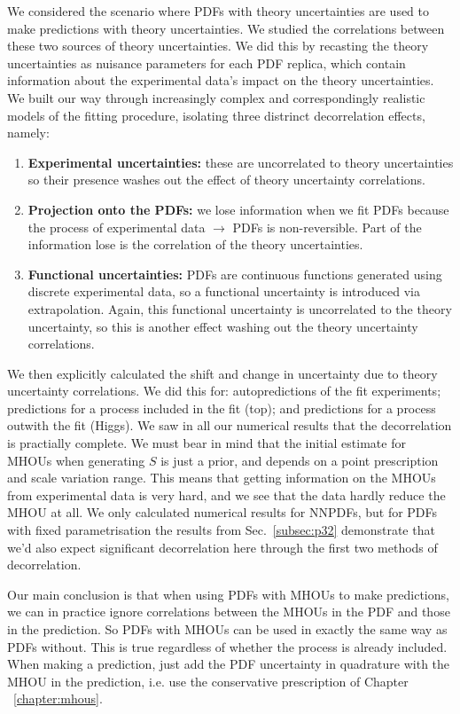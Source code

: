 We considered the scenario where PDFs with theory uncertainties are used to make predictions with theory uncertainties. We studied the correlations between these two sources of theory uncertainties. We did this by recasting the theory uncertainties as nuisance parameters for each PDF replica, which contain information about the experimental data's impact on the theory uncertainties. We built our way through increasingly complex and correspondingly realistic models of the fitting procedure, isolating three distrinct decorrelation effects, namely:
\begin{enumerate}
\item {\bf Experimental uncertainties: }these are uncorrelated to theory uncertainties so their presence washes out the effect of theory uncertainty correlations.
\item {\bf Projection onto the PDFs: }we lose information when we fit PDFs because the process of experimental data $\to$ PDFs is non-reversible. Part of the information lose is the correlation of the theory uncertainties.
\item {\bf Functional uncertainties: }PDFs are continuous functions generated using discrete experimental data, so a functional uncertainty is introduced via extrapolation. Again, this functional uncertainty is uncorrelated to the theory uncertainty, so this is another effect washing out the theory uncertainty correlations.
\end{enumerate}

We then explicitly calculated the shift and change in uncertainty due to theory uncertainty correlations. We did this for: autopredictions of the fit experiments; predictions for a process included in the fit (top); and predictions for a process outwith the fit (Higgs). We saw in all our numerical results that the decorrelation is practially complete. We must bear in mind that the initial estimate for MHOUs when generating $S$ is just a prior, and depends on a point prescription and scale variation range. This means that getting information on the MHOUs from experimental data is very hard, and we see that the data hardly reduce the MHOU at all. We only calculated numerical results for NNPDFs, but for PDFs with fixed parametrisation the results from Sec.~\ref{subsec:p32} demonstrate that we'd also expect significant decorrelation here through the first two methods of decorrelation.

Our main conclusion is that when using PDFs with MHOUs to make predictions, we can in practice ignore correlations between the MHOUs in the PDF and those in the prediction. So PDFs with MHOUs can be used in exactly the same way as PDFs without. This is true regardless of whether the process is already included. When making a prediction, just add the PDF uncertainty in quadrature with the MHOU in the prediction, i.e. use the conservative prescription of Chapter ~\ref{chapter:mhous}. 

